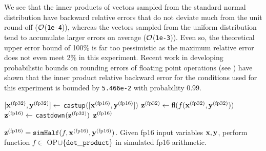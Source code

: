 We see that the inner products of vectors sampled from the standard normal distribution have backward relative errors that do not deviate much from the unit round-off ($\mathcal{O}$({\tt 1e-4})), whereas the vectors sampled from the uniform distribution tend to accumulate larger errors on average ($\mathcal{O}$({\tt 1e-3})). 
Even so, the theoretical upper error bound of 100\% is far too pessimistic as the maximum relative error does not even meet 2\% in this experiment.
Recent work in developing probabilistic bounds on rounding errors of floating point operations (see \cite{Higham2019a,Ipsen2019}) have shown that the inner product relative backward error for the conditions used for this experiment is bounded by {\tt 5.466e-2} with probability 0.99.

\begin{algorithm2e}
	\DontPrintSemicolon %
	$[\mathbf{x}^{(\text{fp32})}, \mathbf{y}^{(\text{fp32})}] \gets$ {\tt castup}$([\mathbf{x}^{(\text{fp16})},\mathbf{y}^{(\text{fp16})}])$
	$\mathbf{z}^{(\text{fp32})} \gets \mathrm{fl}(f(\mathbf{x}^{(\text{fp32})}, \mathbf{y}^{(\text{fp32})}))$ 
	$\mathbf{z}^{(\text{fp16})} \gets$ {\tt castdown}$(\mathbf{z}^{(\text{fp32})})$
	\Return $\mathbf{z}^{(\text{fp16})}$
	\caption{$\mathbf{z}^{(\text{fp16})} = {\tt simHalf}(f, \mathbf{x}^{(\text{fp16})}, \mathbf{y}^{(\text{fp16})})$. Given fp16 input variables $\mathbf{x},\mathbf{y}$, perform function $f\in$ OP$\cup \{{\tt dot\_product} \}$ in simulated fp16 arithmetic. }
	\label{algo:simulate}
\end{algorithm2e}

